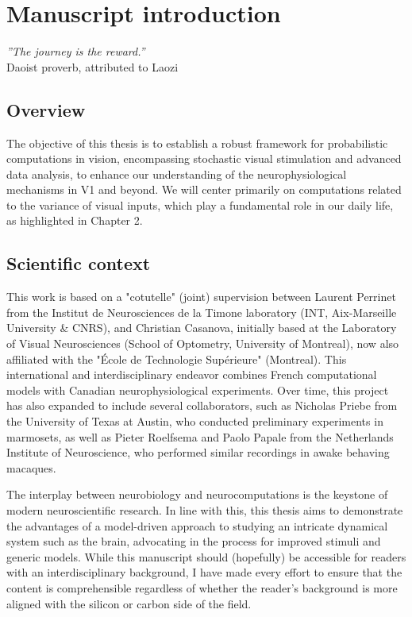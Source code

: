 \chapter{Manuscript introduction}
\begin{flushright}
    \textit{''The journey is the reward.''}\\
    Daoist proverb, attributed to Laozi
\end{flushright}

\section{Overview}
The objective of this thesis is to establish a robust framework for probabilistic computations in vision, encompassing stochastic visual stimulation and advanced data analysis, to enhance our understanding of the neurophysiological mechanisms in \gls{V1} and beyond. We will center primarily on computations related to the variance of visual inputs, which play a fundamental role in our daily life, as highlighted in Chapter 2.

\section{Scientific context}
This work is based on a "cotutelle" (joint) supervision between Laurent Perrinet from the Institut de Neurosciences de la Timone laboratory (INT, Aix-Marseille University \& CNRS), and Christian Casanova, initially based at the Laboratory of Visual Neurosciences (School of Optometry, University of Montreal), now also affiliated with the "\'Ecole de Technologie Supérieure" (Montreal).
This international and interdisciplinary endeavor combines French computational models with Canadian neurophysiological experiments. Over time, this project has also expanded to include several collaborators, such as Nicholas Priebe from the University of Texas at Austin, who conducted preliminary experiments in marmosets, as well as Pieter Roelfsema and Paolo Papale from the Netherlands Institute of Neuroscience, who performed similar recordings in awake behaving macaques.

The interplay between neurobiology and neurocomputations is the keystone of modern neuroscientific research. In line with this, this thesis aims to demonstrate the advantages of a model-driven approach to studying an intricate dynamical system such as the brain, advocating in the process for improved stimuli and generic models. While this manuscript should (hopefully) be accessible for readers with an interdisciplinary background, I have made every effort to ensure that the content is comprehensible regardless of whether the reader's background is more aligned with the silicon or carbon side of the field.

